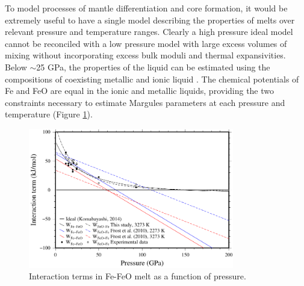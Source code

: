 \documentclass[review]{elsarticle}
\begin{document}
To model processes of mantle differentiation and core formation, it would be extremely useful to have a single model describing the properties of melts over relevant pressure and temperature ranges. Clearly a high pressure ideal model cannot be reconciled with a low pressure model with large excess volumes of mixing without incorporating excess bulk moduli and thermal expansivities. Below $\sim$25 GPa, the properties of the liquid can be estimated using the compositions of coexisting metallic and ionic liquid \citep{TOT2007,Frostetal2010}. The chemical potentials of Fe and FeO are equal in the ionic and metallic liquids, providing the two constraints necessary to estimate Margules parameters at each pressure and temperature (Figure \ref{fig:Fe_O_interaction}).

\begin{figure}[ht!]
  \centering
  \includegraphics[width=0.8\textwidth]{figures/Fe_FeO_interaction_terms}
  \caption{Interaction terms in Fe-FeO melt as a function of pressure.}
  \label{fig:Fe_O_interaction}
\end{figure}
\end{document}
